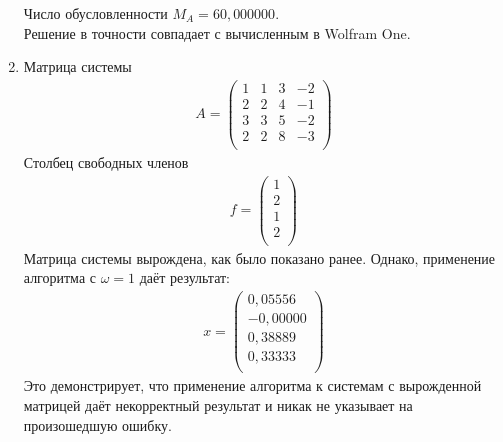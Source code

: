\documentclass[a4paper,12pt,titlepage,finall]{article}
\begin{document}
\begin{enumerate}
Число обусловленности $M_A = 60,000000$.\\
Решение в точности совпадает с вычисленным в Wolfram One.
\item
Матрица системы
\begin{align*}
A = \begin{pmatrix}
1&     1&     3&    -2 \\
   2&     2&     4&    -1 \\
   3&     3&     5&    -2 \\
   2&     2&     8&    -3 \\
\end{pmatrix}
\end{align*}
Столбец свободных членов
\begin{align*}
f = \begin{pmatrix}
1 \\
2 \\
1 \\
2 \\
\end{pmatrix}
\end{align*}
Матрица системы вырождена, как было показано ранее. Однако, применение алгоритма с $\omega = 1$ даёт результат:
\begin{align*}
x = \begin{pmatrix}
0,05556 \\
  -0,00000\\ 
   0,38889 \\
   0,33333 \\
\end{pmatrix}
\end{align*}
Это демонстрирует, что применение алгоритма к системам с вырожденной матрицей даёт некорректный результат и никак не указывает на произошедшую ошибку.


\end{enumerate}
\end{document}
